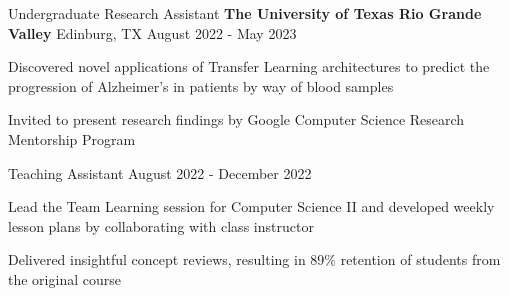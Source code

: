 \begin{cventries}

  \cventry
    {Undergraduate Research Assistant}
    {\textbf{The University of Texas Rio Grande Valley}}
    {Edinburg, TX}
    {August 2022 - May 2023}
    {
      \begin{cvitems}
        \item{Discovered novel applications of Transfer Learning architectures to predict the progression of Alzheimer's in patients by way of blood samples}
        \item{Invited to present research findings by Google Computer Science Research Mentorship Program}
      \end{cvitems}
    }

  \cventry
    {Teaching Assistant}
    {}
    {}
    {August 2022 - December 2022}
    {
      \begin{cvitems}
        \item{Lead the Team Learning session for Computer Science II and developed weekly lesson plans by collaborating with class instructor}
        \item{Delivered insightful concept reviews, resulting in 89\% retention of students from the original course}
      \end{cvitems}
    }

\end{cventries}
